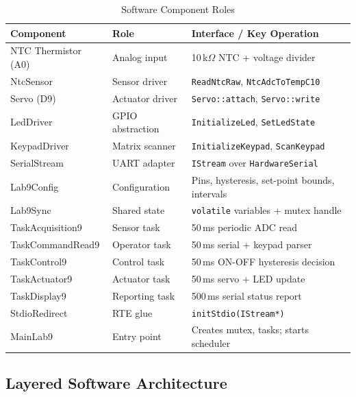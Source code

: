 \documentclass[12pt]{article}
\begin{document}
\begin{table}[H]
\centering
\begin{tabular}{@{}p{3.6cm}p{2.8cm}p{6.0cm}@{}}
\toprule
\textbf{Component} & \textbf{Role} & \textbf{Interface / Key Operation} \\
\midrule
NTC Thermistor (A0)  & Analog input        & 10\,k$\Omega$ NTC + voltage divider \\
NtcSensor            & Sensor driver       & \texttt{ReadNtcRaw}, \texttt{NtcAdcToTempC10} \\
Servo (D9)           & Actuator driver     & \texttt{Servo::attach}, \texttt{Servo::write} \\
LedDriver            & GPIO abstraction    & \texttt{InitializeLed}, \texttt{SetLedState} \\
KeypadDriver         & Matrix scanner      & \texttt{InitializeKeypad}, \texttt{ScanKeypad} \\
SerialStream         & UART adapter        & \texttt{IStream} over \texttt{HardwareSerial} \\
Lab9Config           & Configuration       & Pins, hysteresis, set-point bounds, intervals \\
Lab9Sync             & Shared state        & \texttt{volatile} variables + mutex handle \\
TaskAcquisition9     & Sensor task         & 50\,ms periodic ADC read \\
TaskCommandRead9     & Operator task       & 50\,ms serial + keypad parser \\
TaskControl9         & Control task        & 50\,ms ON-OFF hysteresis decision \\
TaskActuator9        & Actuator task       & 50\,ms servo + LED update \\
TaskDisplay9         & Reporting task      & 500\,ms serial status report \\
StdioRedirect        & RTE glue            & \texttt{initStdio(IStream*)} \\
MainLab9             & Entry point         & Creates mutex, tasks; starts scheduler \\
\bottomrule
\end{tabular}
\caption{Software Component Roles}
\label{tab:components}
\end{table}

\subsection{Layered Software Architecture}
\end{document}
